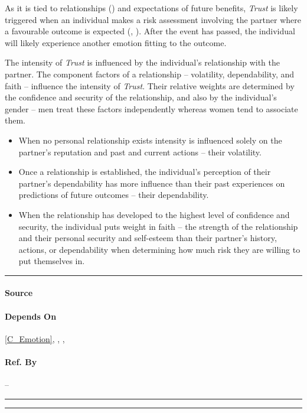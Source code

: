 As it is tied to relationships () and expectations of future
benefits, \textit{Trust} is likely triggered when an individual makes a risk
assessment involving the partner where a favourable outcome is expected
(, ). After the event has passed, the individual
will likely experience another emotion fitting to the outcome.

The intensity of \textit{Trust} is influenced by the individual's relationship
with the partner. The component factors of a relationship
-- volatility, dependability, and faith -- influence the intensity of
\textit{Trust}. Their relative weights are determined by the confidence and
security of the relationship, and also by the individual's gender -- men treat
these factors independently whereas women tend to associate them.
\begin{itemize}
    \item When no personal relationship exists intensity is influenced solely
    on the partner's reputation and past and current actions -- their
    volatility.

    \item Once a relationship is established, the individual's perception of
    their partner's dependability has more influence than their past
    experiences on predictions of future outcomes -- their dependability.

    \item When the relationship has developed to the highest level of
    confidence and security, the individual puts weight in faith -- the
    strength of the relationship and their personal security and self-esteem
    than their partner's history, actions, or dependability when determining
    how much risk they are willing to put themselves in.
\end{itemize}

\hrule

\paragraph{Source} \cite{robert1980emotion, lazarus1991emotion,
    rempel1985trust}

\paragraph{Depends On} \cref{C_Emotion}, , ,

\paragraph{Ref. By} --
\\\hrule\vspace{0.5mm}\hrule

